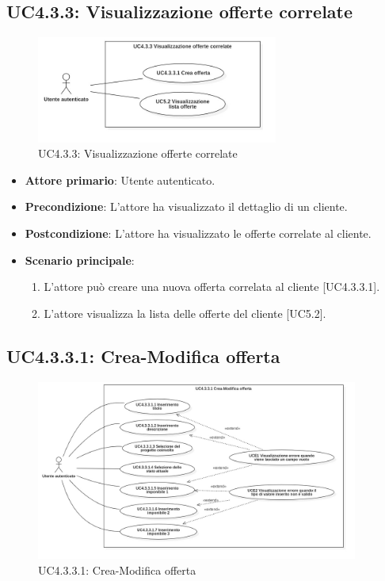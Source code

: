 \pagebreak

\subsection{UC4.3.3: Visualizzazione offerte correlate}
\begin{figure}[!h]
\centering
\includegraphics[width=300px]{../images/UC/.jpeg/UC4.3.3.0-visualizzazioneOfferteCorrelate.jpg}
\caption{UC4.3.3: Visualizzazione offerte correlate}
\end{figure}

\begin{itemize}
\item \textbf{Attore primario}: Utente autenticato.
\item \textbf{Precondizione}: L'attore ha visualizzato il dettaglio di un cliente.
\item \textbf{Postcondizione}: L'attore ha visualizzato le offerte correlate al cliente.
\item \textbf{Scenario principale}:
\begin{enumerate}
\item L'attore può creare una nuova offerta correlata al cliente [UC4.3.3.1].
\item L'attore visualizza la lista delle offerte del cliente [UC5.2].
\end{enumerate}
\end{itemize}

\pagebreak

\subsection{UC4.3.3.1: Crea-Modifica offerta}
\begin{figure}[!h]
\centering
\includegraphics[width=400px]{../images/UC/.jpeg/UC4.3.3.1-nuovaModificaOfferta.jpg}
\caption{UC4.3.3.1: Crea-Modifica offerta}
\end{figure}

